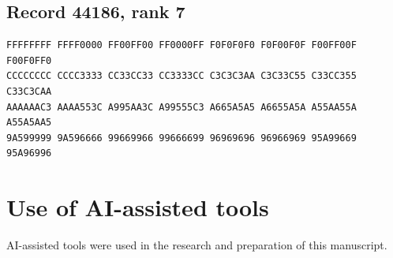 \documentclass[11pt]{amsart}
\theoremstyle{definition}
\theoremstyle{remark}
\numberwithin{equation}{section}
\numberwithin{table}{section}
\begin{document}
\subsection*{Record 44186, rank 7}
\begin{Verbatim}[fontsize=\scriptsize,xleftmargin=1em]
FFFFFFFF FFFF0000 FF00FF00 FF0000FF F0F0F0F0 F0F00F0F F00FF00F F00F0FF0
CCCCCCCC CCCC3333 CC33CC33 CC3333CC C3C3C3AA C3C33C55 C33CC355 C33C3CAA
AAAAAAC3 AAAA553C A995AA3C A99555C3 A665A5A5 A6655A5A A55AA55A A55A5AA5
9A599999 9A596666 99669966 99666699 96969696 96966969 95A99669 95A96996
\end{Verbatim}
\par
{}\par


\section*{Use of AI-assisted tools}

AI-assisted tools were used in the research and preparation of this manuscript.
\end{document}
